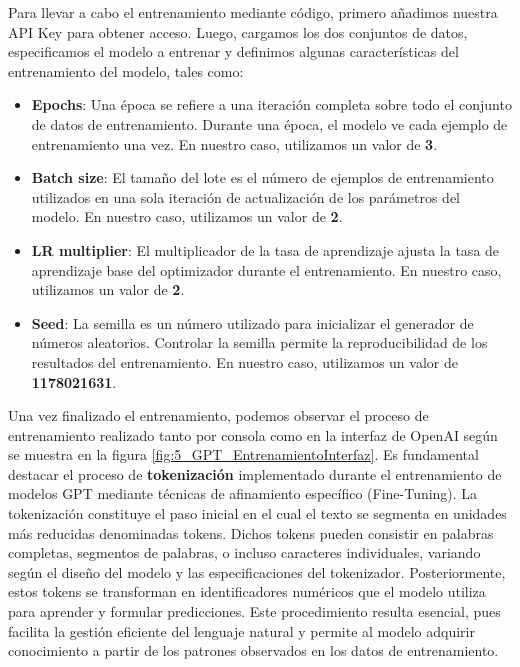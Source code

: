 Para llevar a cabo el entrenamiento mediante código, primero añadimos nuestra \acrshort{API} Key para obtener acceso. Luego, cargamos los dos conjuntos de datos, especificamos el modelo a entrenar y definimos algunas características del entrenamiento del modelo, tales como:

\begin{itemize}
\item \textbf{Epochs}: Una época se refiere a una iteración completa sobre todo el conjunto de datos de entrenamiento. Durante una época, el modelo ve cada ejemplo de entrenamiento una vez. En nuestro caso, utilizamos un valor de \textbf{3}.
\item \textbf{Batch size}: El tamaño del lote es el número de ejemplos de entrenamiento utilizados en una sola iteración de actualización de los parámetros del modelo. En nuestro caso, utilizamos un valor de \textbf{2}.
\item \textbf{LR multiplier}: El multiplicador de la tasa de aprendizaje ajusta la tasa de aprendizaje base del optimizador durante el entrenamiento. En nuestro caso, utilizamos un valor de \textbf{2}.
\item \textbf{Seed}: La semilla es un número utilizado para inicializar el generador de números aleatorios. Controlar la semilla permite la reproducibilidad de los resultados del entrenamiento. En nuestro caso, utilizamos un valor de \textbf{1178021631}.
\end{itemize}

\bigskip %
Una vez finalizado el entrenamiento, podemos observar el proceso de entrenamiento realizado tanto por consola como en la interfaz de OpenAI según se muestra en la figura \ref{fig:5_GPT_EntrenamientoInterfaz}. Es fundamental destacar el proceso de \textbf{tokenización} \cite{Tokenizacion} implementado durante el entrenamiento de modelos \acrshort{GPT} mediante técnicas de afinamiento específico (Fine-Tuning). La tokenización constituye el paso inicial en el cual el texto se segmenta en unidades más reducidas denominadas tokens. Dichos tokens pueden consistir en palabras completas, segmentos de palabras, o incluso caracteres individuales, variando según el diseño del modelo y las especificaciones del tokenizador. Posteriormente, estos \gls{token}s se transforman en identificadores numéricos que el modelo utiliza para aprender y formular predicciones. Este procedimiento resulta esencial, pues facilita la gestión eficiente del lenguaje natural y permite al modelo adquirir conocimiento a partir de los patrones observados en los datos de entrenamiento.


